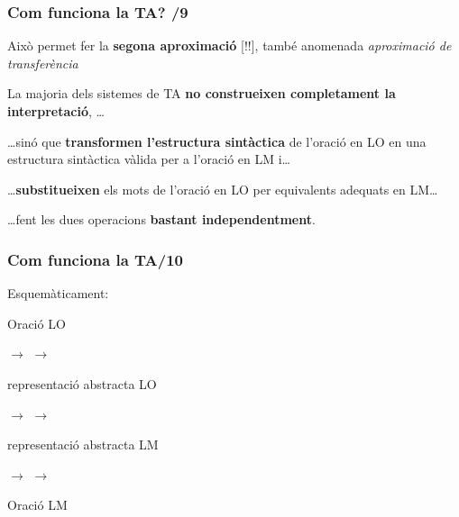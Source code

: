 \documentclass{beamer}
\newcommand{\empha}[1]{\emph{#1}\/}
\begin{document}
\begin{frame}
\frametitle{ Com funciona la TA?  /9}

{
{Això permet fer la \textbf{segona aproximació} [!!], també anomenada \empha{aproximació de transferència}}
\begin{itemize}\setlength{\itemsep}{0pt}
{\item[] La majoria dels sistemes de TA \textbf{no construeixen
    completament la interpretació}, \ldots}

\pause
{\item[]\ldots sinó que \textbf{transformen l'estructura sintàctica} de
  l'oració en LO en una estructura sintàctica vàlida per a l'oració en
  LM i\ldots}

\pause
{\item[]\ldots \textbf{substitueixen} els  mots de l'oració en LO per
  equivalents adequats en LM\ldots }

\pause
{\item[]\ldots fent les dues operacions \textbf{bastant
    independentment}.}
\end{itemize}
}

\end{frame}

\begin{frame}
  \frametitle{Com funciona la TA/10}
Esquemàticament:
\begin{small}
\begin{center}
\parbox{1.0cm}{Oració LO} $\to$
 $\to$ 
\parbox{1.0cm}{repre\-senta\-ció abs\-tracta LO} $\to$
 $\to$
\parbox{1.0cm}{repre\-senta\-ció abs\-tracta LM} $\to$
 $\to$
\parbox{1.0cm}{Oració LM} 
\end{center}
  \end{small}

\end{frame}
\end{document}
